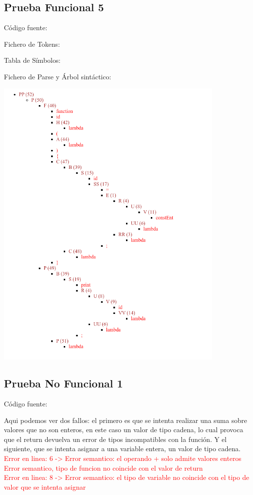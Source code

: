 \documentclass{article}[a4paper]
\newcommand\tab[1][1cm]{\hspace*{#1}}
\begin{document}
\begin{appendices}
\subsection{Prueba Funcional 5}
Código fuente:

\hspace{\parindent} Fichero de Tokens:

\hspace{\parindent} Tabla de Símbolos:

\hspace{\parindent} Fichero de Parse y Árbol sintáctico:

\includegraphics[width=0.85\textwidth]{arbol5.png}

\newpage

\subsection{Prueba No Funcional 1}
Código fuente:

Aqui podemos ver dos fallos: el primero es que se intenta realizar una suma sobre valores que no son enteros, en este caso un valor de tipo cadena,
lo cual provoca que el return devuelva un error de tipos incompatibles con la función. Y el siguiente, que se intenta asignar a una variable entera, un valor de tipo cadena.\\
\tab \textcolor{red}{Error en linea: 6 -> Error semantico: el operando + solo admite valores enteros}\\
\tab \textcolor{red}{Error semantico, tipo de funcion no coincide con el valor de return}\\
\tab \textcolor{red}{Error en linea: 8 -> Error semantico: el tipo de variable no coincide con el tipo de valor que se intenta asignar}


\end{appendices}
\end{document}
